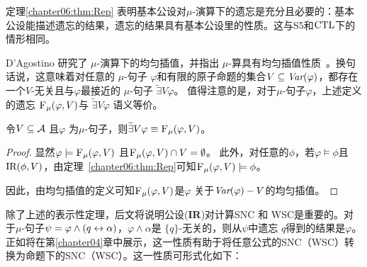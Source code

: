 定理\ref{chapter06:thm:Rep} 表明基本公设对$\mu$-演算下的遗忘是充分且必要的：基本公设能描述遗忘的结果，遗忘的结果具有基本公设里的性质。这与S5和$\textrm{CTL}$下的情形相同。

D'Agostino 研究了 $\mu$-演算下的均匀插值，并指出 $\mu$-算具有均匀插值性质~\cite{d1996uniform,d2000logical,d2006modal}。换句话说，这意味着对任意的 $\mu$-句子 $\varphi$和有限的原子命题的集合$V\subseteq \textit{Var}(\varphi)$，都存在一个$V$-无关且与$\varphi$最接近的 $\mu$-句子 $\widetilde{\exists}V \varphi$。
值得注意的是，对于$\mu$-句子$\varphi$，上述定义的遗忘 ${\textsc{F}_{\textsc{$\mu$}}}(\varphi, V)$与 $\widetilde{\exists}V \varphi$\cite{d2006modal} 语义等价。

\begin{corollary}\label{cor:unifeqforget}
	令$V \subseteq {\cal A}$ 且$\varphi$ 为$\mu$-句子，则$\widetilde{\exists}V \varphi \equiv {\textsc{F}_{\textsc{$\mu$}}}(\varphi, V)$。
\end{corollary}
\begin{proof}
	显然$\varphi \models {\textsc{F}_{\textsc{$\mu$}}}(\varphi, V)$ 且${\textsc{F}_{\textsc{$\mu$}}}(\varphi, V) \cap V = \emptyset$。
	此外，对任意的$\phi$，若$\varphi \models \phi$且$\textrm{IR}(\phi, V)$，由定理~\ref{chapter06:thm:Rep}可知${\textsc{F}_{\textsc{$\mu$}}}(\varphi, V) \models \phi$。 
	
	因此，由均匀插值的定义可知${\textsc{F}_{\textsc{$\mu$}}}(\varphi, V)$是$\varphi$ 关于$\textit{Var}(\varphi)-V$的均匀插值。 
\end{proof}

除了上述的表示性定理，后文将说明公设(\textbf{IR})对计算SNC 和 WSC是重要的。对于$\mu$-句子$\psi = \varphi \wedge (q \leftrightarrow \alpha)$，$\varphi \wedge \alpha$是 $\{q\}$-无关的，则从$\psi$中遗忘 $q$得到的结果是$\varphi$。正如将在第\ref{chapter04}章中展示，这一性质有助于将任意公式的SNC（WSC）转换为命题下的SNC（WSC）。这一性质可形式化如下：

